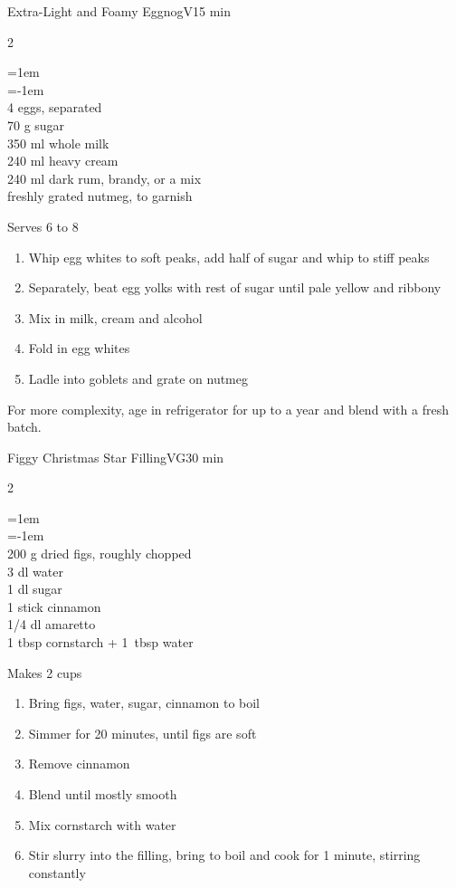 \documentclass{article}
\newenvironment{recipe}[3][]
    {\begin{cardbase}[#1]{#2}{#3}
    \columnratio{0.333}
    \begin{paracol}{2}}
    {\end{paracol}\end{cardbase}}
\newcommand{\nextcolumn}{\switchcolumn}
\newenvironment{ingredients}
    {
    \begin{obeylines}
    \vspace{\parskip}
    \setlength{\parskip}{0.25em}
    \vspace{-0.25em}
    \leftskip=1em
    \parindent=-1em}
    {\end{obeylines}}
\newenvironment{steps}
    {\begin{enumerate}[leftmargin=*,topsep=0pt]}
    {\end{enumerate}}
\newcommand{\tag}[1]{\hspace{1em}#1}
\newcommand{\symboltag}[2]{\tag{#1\hspace{0.4em}#2}}
\newcommand{\totaltime}[1]{\symboltag{\raisebox{-0.1em}{\small\StopWatchEnd}}{#1}}
\begin{document}
\begin{recipe}{Extra-Light and Foamy Eggnog}{\tag{V}\totaltime{15 min}}
\begin{ingredients}
4 eggs, separated
70 g sugar
350 ml whole milk
240 ml heavy cream
240 ml dark rum, brandy, or a mix
freshly grated nutmeg, to garnish
\end{ingredients}
\nextcolumn
Serves 6 to 8
\begin{steps}
    \item Whip egg whites to soft peaks, add half of sugar and whip to stiff peaks
    \item Separately, beat egg yolks with rest of sugar until pale yellow and ribbony
    \item Mix in milk, cream and alcohol
    \item Fold in egg whites
    \item Ladle into goblets and grate on nutmeg
\end{steps}
For more complexity, age in refrigerator for up to a year and blend with a fresh batch.
\end{recipe}

\begin{recipe}{Figgy Christmas Star Filling}{\tag{VG}\totaltime{30 min}}
\begin{ingredients}
200 g dried figs, roughly chopped
3 dl water
1 dl sugar
1 stick cinnamon
1/4 dl amaretto
1 tbsp cornstarch + 1~tbsp water
\end{ingredients}
\nextcolumn
Makes 2 cups
\begin{steps}
    \item Bring figs, water, sugar, cinnamon to boil
    \item Simmer for 20 minutes, until figs are soft
    \item Remove cinnamon
    \item Blend until mostly smooth
    \item Mix cornstarch with water
    \item Stir slurry into the filling, bring to boil and cook for 1 minute, stirring constantly
\end{steps}
\end{recipe}
\end{document}
